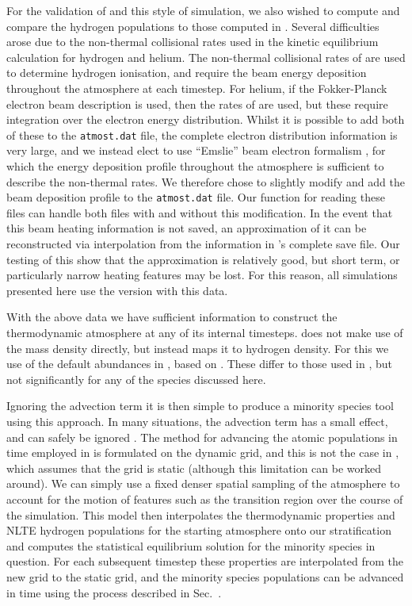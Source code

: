 For the validation of \Lw{} and this style of simulation, we also wished to compute and compare the hydrogen populations to those computed in \Radyn{}.
Several difficulties arose due to the non-thermal collisional rates used in the kinetic equilibrium calculation for hydrogen and helium.
The non-thermal collisional rates of \citet{1993Fang} are used to determine hydrogen ionisation, and require the beam energy deposition throughout the atmosphere at each timestep.
For helium, if the Fokker-Planck electron beam description is used, then the rates of \citet{Arnaud1985} are used, but these require integration over the electron energy distribution.
Whilst it is possible to add both of these to the \texttt{atmost.dat} file, the complete electron distribution information is very large, and we instead elect to use ``Emslie'' beam electron formalism \citep{Emslie1978}, for which the energy deposition profile throughout the atmosphere is sufficient to describe the non-thermal rates.
We therefore chose to slightly modify \Radyn{} and add the beam deposition profile to the \texttt{atmost.dat} file.
Our function for reading these files can handle both files with and without this modification.
In the event that this beam heating information is not saved, an approximation of it can be reconstructed via interpolation from the information in \Radyn{}'s complete save file.
Our testing of this show that the approximation is relatively good, but short term, or particularly narrow heating features may be lost.
For this reason, all simulations presented here use the version with this data.

With the above data we have sufficient information to construct the \Radyn{} thermodynamic atmosphere at any of its internal timesteps.
\Lw{} does not make use of the mass density directly, but instead maps it to hydrogen density.
For this we use of the default abundances in \Lw{}, based on \citet{Asplund2009}.
These differ to those used in \Radyn{}, but not significantly for any of the species discussed here.

Ignoring the advection term it is then simple to produce a minority species tool using this approach.
In many situations, the advection term has a small effect, and can safely be ignored \NeedRef{} .
The method for advancing the atomic populations in time employed in \Radyn{} is formulated on the dynamic grid, and this is not the case in \Lw{}, which assumes that the grid is static (although this limitation can be worked around).
We can simply use a fixed denser spatial sampling of the atmosphere to account for the motion of features such as the transition region over the course of the simulation.
This model then interpolates the thermodynamic properties and NLTE hydrogen populations for the starting atmosphere onto our stratification and computes the statistical equilibrium solution for the minority species in question.
For each subsequent timestep these properties are interpolated from the new \Radyn{} grid to the static grid, and the minority species populations can be advanced in time using the process described in Sec.~\NeedRef{}.

